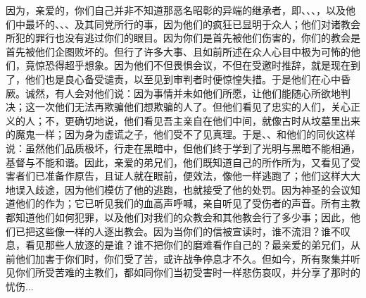 因为，亲爱的，你们自己并非不知道那恶名昭彰的异端的继承者，即、、、，以及他们中最坏的、、、及其同党所行的事，因为他们的疯狂已显明于众人；他们对诸教会所犯的罪行也没有逃过你们的眼目。因为你们是首先被他们伤害的，你们的教会是首先被他们企图败坏的。但行了许多大事、且如前所述在众人心目中极为可怖的他们，竟惊恐得超乎想象。因为他们不但畏惧会议，不但在受邀时推辞，就是现在到了，他们也是良心备受谴责，以至见到审判者时便惊惶失措。于是他们在心中昏厥。诚然，有人会对他们说：因为事情并未如他们所愿，让他们能随心所欲地判决；这一次他们无法再欺骗他们想欺骗的人了。但他们看见了忠实的人们，关心正义的人；不，更确切地说，他们看见吾主亲自在他们中间，就像古时从坟墓里出来的魔鬼一样；因为身为虚谎之子，他们受不了见真理。于是、、和他们的同伙这样说：虽然他们品质极坏，行走在黑暗中，但他们终于学到了光明与黑暗不能相通，基督与不能和谐。因此，亲爱的弟兄们，他们既知道自己的所作所为，又看见了受害者们已准备作原告，且证人就在眼前，便效法，像他一样逃跑了；他们这样大大地误入歧途，因为他们模仿了他的逃跑，也就接受了他的处罚。因为神圣的会议知道他们的作为；它已听见我们的血高声呼喊，亲自听见了受伤者的声音。所有主教都知道他们如何犯罪，以及他们对我们的众教会和其他教会行了多少事；因此，他们已把这些像一样的人逐出教会。因为当你们的信被宣读时，谁不流泪？谁不叹息，看见那些人放逐的是谁？谁不把你们的磨难看作自己的？最亲爱的弟兄们，从前他们加害于你们时，你们受了苦，或许战争停息才不久。但如今，所有聚集并听见你们所受苦难的主教们，都如同你们当初受害时一样悲伤哀叹，并分享了那时的忧伤...\par


